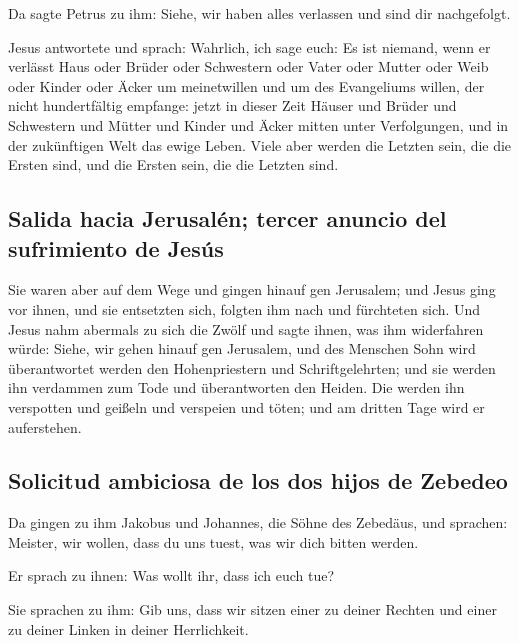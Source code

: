  Da sagte Petrus zu ihm: Siehe, wir haben alles verlassen
und sind dir nachgefolgt.

 Jesus antwortete und sprach: Wahrlich, ich sage euch: Es
ist niemand, wenn er verlässt Haus oder Brüder oder Schwestern oder
Vater oder Mutter oder Weib oder Kinder oder Äcker um meinetwillen und
um des Evangeliums willen,  der nicht hundertfältig
empfange: jetzt in dieser Zeit Häuser und Brüder und Schwestern und
Mütter und Kinder und Äcker mitten unter Verfolgungen, und in der
zukünftigen Welt das ewige Leben.  Viele aber werden die
Letzten sein, die die Ersten sind, und die Ersten sein, die die Letzten
sind.

\hypertarget{salida-hacia-jerusaluxe9n-tercer-anuncio-del-sufrimiento-de-jesuxfas}{%
\subsection{Salida hacia Jerusalén; tercer anuncio del sufrimiento de
Jesús}\label{salida-hacia-jerusaluxe9n-tercer-anuncio-del-sufrimiento-de-jesuxfas}}

 Sie waren aber auf dem Wege und gingen hinauf gen
Jerusalem; und Jesus ging vor ihnen, und sie entsetzten sich, folgten
ihm nach und fürchteten sich. Und Jesus nahm abermals zu sich die Zwölf
und sagte ihnen, was ihm widerfahren würde:  Siehe, wir
gehen hinauf gen Jerusalem, und des Menschen Sohn wird überantwortet
werden den Hohenpriestern und Schriftgelehrten; und sie werden ihn
verdammen zum Tode und überantworten den Heiden.  Die
werden ihn verspotten und geißeln und verspeien und töten; und am
dritten Tage wird er auferstehen.

\hypertarget{solicitud-ambiciosa-de-los-dos-hijos-de-zebedeo}{%
\subsection{Solicitud ambiciosa de los dos hijos de
Zebedeo}\label{solicitud-ambiciosa-de-los-dos-hijos-de-zebedeo}}

 Da gingen zu ihm Jakobus und Johannes, die Söhne des
Zebedäus, und sprachen: Meister, wir wollen, dass du uns tuest, was wir
dich bitten werden.

 Er sprach zu ihnen: Was wollt ihr, dass ich euch tue?

 Sie sprachen zu ihm: Gib uns, dass wir sitzen einer zu
deiner Rechten und einer zu deiner Linken in deiner Herrlichkeit.

